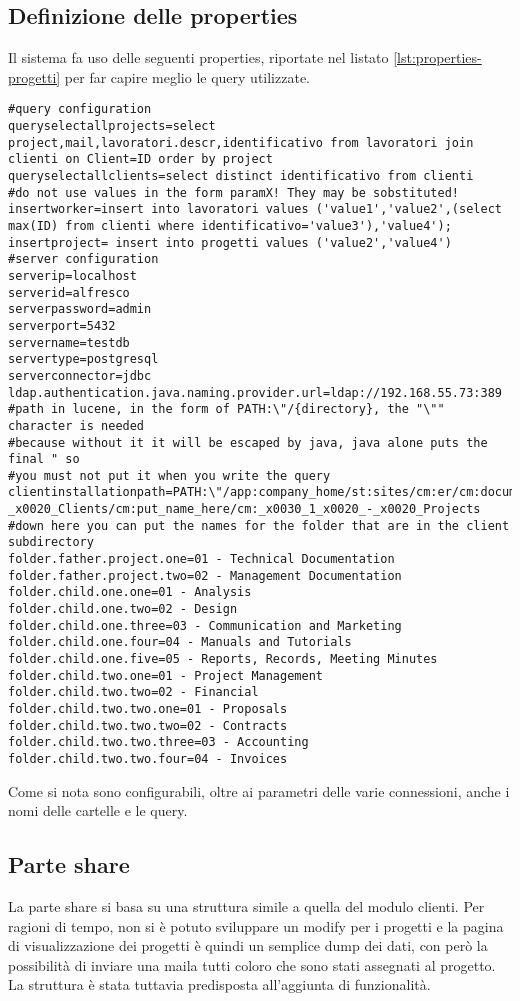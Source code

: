 \subsection{Definizione delle properties}

Il sistema fa uso delle seguenti properties, riportate nel listato \ref{lst:properties-progetti} per far capire meglio le query utilizzate.
\begin{lstlisting}[label=lst:properties-progetti,caption=properties del modulo relativo ai progetti]
#query configuration
queryselectallprojects=select project,mail,lavoratori.descr,identificativo from lavoratori join clienti on Client=ID order by project
queryselectallclients=select distinct identificativo from clienti
#do not use values in the form paramX! They may be sobstituted!
insertworker=insert into lavoratori values ('value1','value2',(select max(ID) from clienti where identificativo='value3'),'value4');
insertproject= insert into progetti values ('value2','value4')
#server configuration
serverip=localhost
serverid=alfresco
serverpassword=admin
serverport=5432
servername=testdb
servertype=postgresql
serverconnector=jdbc
ldap.authentication.java.naming.provider.url=ldap://192.168.55.73:389
#path in lucene, in the form of PATH:\"/{directory}, the "\"" character is needed 
#because without it it will be escaped by java, java alone puts the final " so 
#you must not put it when you write the query
clientinstallationpath=PATH:\"/app:company_home/st:sites/cm:er/cm:documentLibrary/cm:_x0030_2_x0020_-_x0020_Clients/cm:put_name_here/cm:_x0030_1_x0020_-_x0020_Projects
#down here you can put the names for the folder that are in the client subdirectory
folder.father.project.one=01 - Technical Documentation
folder.father.project.two=02 - Management Documentation
folder.child.one.one=01 - Analysis
folder.child.one.two=02 - Design
folder.child.one.three=03 - Communication and Marketing
folder.child.one.four=04 - Manuals and Tutorials
folder.child.one.five=05 - Reports, Records, Meeting Minutes
folder.child.two.one=01 - Project Management
folder.child.two.two=02 - Financial
folder.child.two.two.one=01 - Proposals
folder.child.two.two.two=02 - Contracts
folder.child.two.two.three=03 - Accounting
folder.child.two.two.four=04 - Invoices
\end{lstlisting}
Come si nota sono configurabili, oltre ai parametri delle varie  connessioni, anche i nomi delle cartelle e le query.

\subsection{Parte share}
La parte share si basa su una struttura simile a quella del modulo clienti. Per ragioni di tempo, non si è potuto sviluppare un modify per i progetti e la pagina di visualizzazione dei progetti è quindi un semplice dump dei dati, con però la possibilità di inviare una maila  tutti coloro che sono stati assegnati al progetto. La struttura è stata tuttavia predisposta all’aggiunta di funzionalità.

